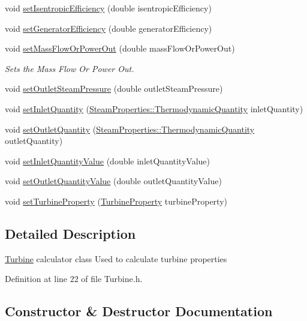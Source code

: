 \begin{DoxyCompactItemize}
\item 
void \hyperlink{class_turbine_ae67daa481ef48bcf8aef84bcccb4611d}{set\+Isentropic\+Efficiency} (double isentropic\+Efficiency)
\item 
void \hyperlink{class_turbine_a51e9c5050a5be51b86dc23e690bd3f40}{set\+Generator\+Efficiency} (double generator\+Efficiency)
\item 
void \hyperlink{class_turbine_a73522631e2eeefa8ea14d5b537e3e760}{set\+Mass\+Flow\+Or\+Power\+Out} (double mass\+Flow\+Or\+Power\+Out)
\begin{DoxyCompactList}\small\item\em Sets the Mass Flow Or Power Out. \end{DoxyCompactList}\item 
void \hyperlink{class_turbine_ab9612657de02e4523492b687917b4091}{set\+Outlet\+Steam\+Pressure} (double outlet\+Steam\+Pressure)
\item 
void \hyperlink{class_turbine_aecc05c70870fb11bbc0bb4fe5d8438bd}{set\+Inlet\+Quantity} (\hyperlink{class_steam_properties_ae0294bedf7d178c2d8fb6aed0f62fbff}{Steam\+Properties\+::\+Thermodynamic\+Quantity} inlet\+Quantity)
\item 
void \hyperlink{class_turbine_ad5ff4ba1657aac9519a6841336ec571c}{set\+Outlet\+Quantity} (\hyperlink{class_steam_properties_ae0294bedf7d178c2d8fb6aed0f62fbff}{Steam\+Properties\+::\+Thermodynamic\+Quantity} outlet\+Quantity)
\item 
void \hyperlink{class_turbine_ac01a053462c83e21ecc2158e75477542}{set\+Inlet\+Quantity\+Value} (double inlet\+Quantity\+Value)
\item 
void \hyperlink{class_turbine_ab37326068f633280de8f8144b9c8eb89}{set\+Outlet\+Quantity\+Value} (double outlet\+Quantity\+Value)
\item 
void \hyperlink{class_turbine_abb3f16cefe52f4e9c7b32b2bb17a68ee}{set\+Turbine\+Property} (\hyperlink{class_turbine_a5db4f65cf2539e3837684d53221ade12}{Turbine\+Property} turbine\+Property)
\end{DoxyCompactItemize}


\subsection{Detailed Description}
\hyperlink{class_turbine}{Turbine} calculator class Used to calculate turbine properties 

Definition at line 22 of file Turbine.\+h.



\subsection{Constructor \& Destructor Documentation}
\mbox{\label{class_turbine_a3c3c871b9fe57d48dd06b109794381dc}} 
